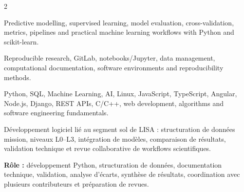 \documentclass[8pt,a4paper,ragged2e,withhyper]{altacv}
\begin{document}
\begin{paracol}{2}

\divider
{}
\divider

\medskip


\divider
{}
\divider
{}
\divider
{}


\small{Predictive modelling, supervised learning, model evaluation, cross-validation, metrics, pipelines and practical machine learning workflows with Python and scikit-learn.}

\divider

\small{Reproducible research, GitLab, notebooks/Jupyter, data management, computational documentation, software environments and reproducibility methods.}

\divider

\small{Python, SQL, Machine Learning, AI, Linux, JavaScript, TypeScript, Angular, Node.js, Django, REST APIs, C/C++, web development, algorithms and software engineering fundamentals.}

\end{paracol}



Développement logiciel lié au segment sol de LISA : structuration de données mission, niveaux L0--L3, intégration de modèles, comparaison de résultats, validation technique et revue collaborative de workflows scientifiques.

\textbf{Rôle :} développement Python, structuration de données, documentation technique, validation, analyse d’écarts, synthèse de résultats, coordination avec plusieurs contributeurs et préparation de revues.
\end{document}
